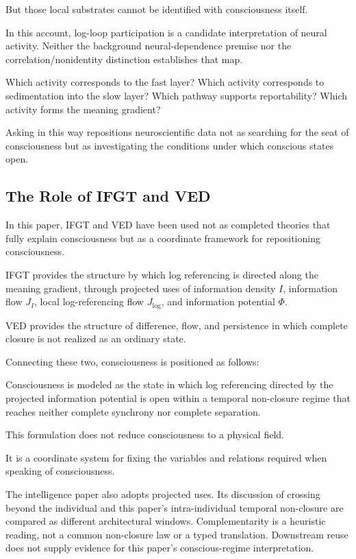 But those local substrates cannot be identified with consciousness itself.

In this account, log-loop participation is a candidate interpretation of neural activity. Neither the background neural-dependence premise nor the correlation/nonidentity distinction establishes that map.

Which activity corresponds to the fast layer? Which activity corresponds to sedimentation into the slow layer? Which pathway supports reportability? Which activity forms the meaning gradient?

Asking in this way repositions neuroscientific data not as searching for the seat of consciousness but as investigating the conditions under which conscious states open.

\subsection{The Role of IFGT and VED}


In this paper, IFGT and VED have been used not as completed theories that fully explain consciousness but as a coordinate framework for repositioning consciousness.

IFGT provides the structure by which log referencing is directed along the meaning gradient, through projected uses of information density $I$, information flow $J_I$, local log-referencing flow $J_{\log}$, and information potential $\Phi$.

VED provides the structure of difference, flow, and persistence in which complete closure is not realized as an ordinary state.

Connecting these two, consciousness is positioned as follows:

Consciousness is modeled as the state in which log referencing directed by the projected information potential is open within a temporal non-closure regime that reaches neither complete synchrony nor complete separation.

This formulation does not reduce consciousness to a physical field.

It is a coordinate system for fixing the variables and relations required when speaking of consciousness.

The intelligence paper \cite{Intelligence} also adopts projected uses.
Its discussion of crossing beyond the individual and this paper's
intra-individual temporal non-closure are compared as different
architectural windows. Complementarity is a heuristic reading, not a
common non-closure law or a typed translation. Downstream reuse does not
supply evidence for this paper's conscious-regime interpretation.


